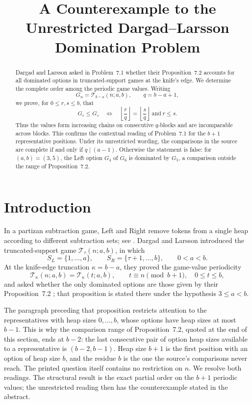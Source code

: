 \documentclass[11pt]{amsart}
\title{A Counterexample to the Unrestricted Dargad--Larsson Domination Problem}
\date{}
\newcommand{\TS}{\mathcal{T}}
\begin{document}
\begin{abstract}
Dargad and Larsson asked in Problem~7.1 whether their Proposition~7.2
accounts for all dominated options in truncated-support games at the
knife's edge. We determine the complete order among the periodic game
values. Writing
\[
G_n=\TS_{b-a}(n;a,b),\qquad q=b-a+1,
\]
we prove, for $0\le r,s\le b$, that
\[
G_r\le G_s
\quad\Longleftrightarrow\quad
\left\lfloor\frac rq\right\rfloor=
\left\lfloor\frac sq\right\rfloor
\ \text{and}\ r\le s.
\]
Thus the values form increasing chains on consecutive $q$-blocks and
are incomparable across blocks. This confirms the contextual reading of
Problem~7.1 for the $b+1$ representative positions. Under its
unrestricted wording, the comparisons in the source are complete if and
only if $q\mid(a-1)$. Otherwise the statement is false: for
$(a,b)=(3,5)$, the Left option $G_4$ of $G_6$ is dominated by $G_5$, a
comparison outside the range of Proposition~7.2.
\end{abstract}

\maketitle

\section{Introduction}

In a partizan subtraction game, Left and Right remove tokens from a
single heap according to different subtraction sets; see
\cite{DHNP}. Dargad and Larsson introduced the truncated-support game
$\TS_\tau(n;a,b)$, in which
\[
S_L=\{1,\dots,a\},\qquad S_R=\{\tau+1,\dots,b\},
\qquad 0<a<b.
\]
At the knife-edge truncation $\kappa=b-a$, they proved the game-value
periodicity
\begin{equation}\label{eq:periodicity}
\TS_\kappa(n;a,b)=\TS_\kappa(t;a,b),
\qquad t\equiv n\pmod{b+1},\quad 0\le t\le b,
\end{equation}
and asked whether the only dominated options are those given by their
Proposition~7.2 \cite[Problem~7.1]{DL}; that proposition is stated
there under the hypothesis $3\le a<b$.

The paragraph preceding that proposition restricts attention to the
representatives with heap sizes $0,\dots,b$, whose options have heap
sizes at most $b-1$. This is why the comparison range of
Proposition~7.2, quoted at the end of this section, ends at $b-2$: the
last consecutive pair of option heap
sizes available to a representative is $(b-2,b-1)$. Heap size $b+1$ is
the first position with an option of heap size $b$, and the residue $b$
is the one the source's comparisons never reach. The printed
question itself contains no restriction on $n$. We resolve both
readings. The structural result is the exact
partial order on the $b+1$ periodic values; the unrestricted reading
then has the counterexample stated in the abstract.
\end{document}
